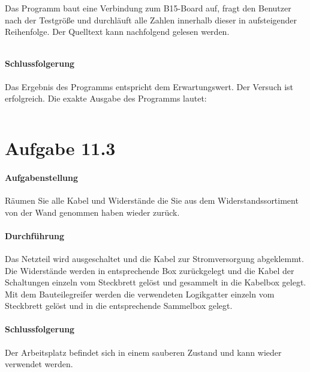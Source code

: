 Das Programm baut eine Verbindung zum B15-Board auf, fragt den Benutzer nach der Testgröße und durchläuft alle Zahlen innerhalb dieser in aufsteigender Reihenfolge. Der Quelltext kann nachfolgend gelesen werden.

\fontsize{12pt}{12pt}\inputminted[linenos=true, breaklines]{cpp}{../task11/main.cpp}

\paragraph{Schlussfolgerung}
Das Ergebnis des Programms entspricht dem Erwartungswert. Der Versuch ist erfolgreich. Die exakte Ausgabe des Programms lautet:

\fontsize{10pt}{10pt}\inputminted[breaklines]{console}{../task11/output.txt}

\section{Aufgabe 11.3}
\paragraph{Aufgabenstellung}
Räumen Sie alle Kabel und Widerstände die Sie aus dem Widerstandssortiment von der Wand genommen haben wieder zurück.

\paragraph{Durchführung}
Das Netzteil wird ausgeschaltet und die Kabel zur Stromversorgung abgeklemmt. Die Widerstände werden in entsprechende Box zurückgelegt und die Kabel der Schaltungen einzeln vom Steckbrett gelöst und gesammelt in die Kabelbox gelegt. Mit dem Bauteilegreifer werden die verwendeten Logikgatter einzeln vom Steckbrett gelöst und in die entsprechende Sammelbox gelegt.

\paragraph{Schlussfolgerung}
Der Arbeitsplatz befindet sich in einem sauberen Zustand und kann wieder verwendet werden.